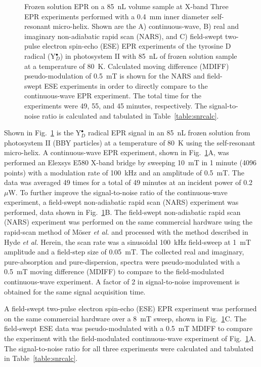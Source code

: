 \begin{figure}[htbp]
\caption[Frozen solution EPR on a 85~nL volume sample at X-band.]{Frozen solution EPR on a 85~nL volume sample at X-band Three EPR experiments performed with a 0.4~mm inner diameter self-resonant micro-helix. Shown are the A) continuous-wave, B) real and imaginary non-adiabatic rapid scan (NARS), and C) field-swept two-pulse electron spin-echo (ESE) EPR experiments of the tyrosine D radical (Y$_D^\bullet$) in photosystem II with 85~nL of frozen solution sample at a temperature of 80~K. Calculated moving difference (MDIFF) pseudo-modulation of 0.5~mT is shown for the NARS and field-swept ESE experiments in order to directly compare to the continuous-wave EPR experiment. The total time for the experiments were 49, 55, and 45 minutes, respectively. The signal-to-noise ratio is calculated and tabulated in Table~\ref{table:snrcalc}.}
\label{fig:BBYPSII}
\end{figure}

Shown in Fig.~\ref{fig:BBYPSII} is the Y$_D^\bullet$ radical EPR signal in an 85~nL frozen solution from photosystem II (BBY particles) at a temperature of 80~K using the self-resonant micro-helix. A continuous-wave EPR experiment, shown in Fig.~\ref{fig:BBYPSII}A, was performed an Elexsys E580 X-band bridge by sweeping 10~mT in 1 minute (4096 points) with a modulation rate of 100~kHz and an amplitude of 0.5~mT. The data was averaged 49 times for a total of 49 minutes at an incident power of 0.2~$\mu$W. To further improve the signal-to-noise ratio of the continuous-wave experiment, a field-swept non-adiabatic rapid scan (NARS) experiment was performed, data shown in Fig.~\ref{fig:BBYPSII}B. The field-swept non-adiabatic rapid scan (NARS) experiment was performed on the same commercial hardware using the rapid-scan method of M\"{o}ser {\em et al.}\cite{MOSER2017} and processed with the method described in Hyde {\em et al.}\cite{Hyde2013MDIFF} Herein, the scan rate was a sinusoidal 100~kHz field-sweep at 1~mT amplitude and a field-step size of 0.05~mT. The collected real and imaginary, pure-absorption and pure-dispersion, spectra were pseudo-modulated with a 0.5~mT moving difference (MDIFF)\cite{Hyde2013MDIFF} to compare to the field-modulated continuous-wave experiment. A factor of 2 in signal-to-noise improvement is obtained for the same signal acquisition time. 

A field-swept two-pulse electron spin-echo (ESE) EPR experiment was performed on the same commercial hardware over a 8~mT sweep, shown in Fig.~\ref{fig:BBYPSII}C. The field-swept ESE data was pseudo-modulated with a 0.5~mT MDIFF to compare the experiment with the field-modulated continuous-wave experiment of Fig.~\ref{fig:BBYPSII}A. The signal-to-noise ratio for all three experiments were calculated and tabulated in Table~\ref{table:snrcalc}. 

